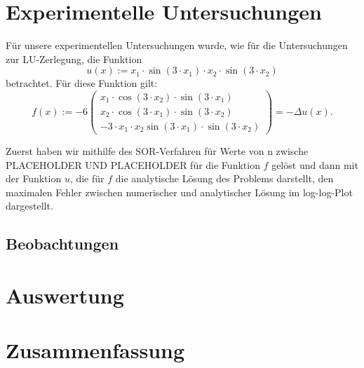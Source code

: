 \documentclass{scrartcl}
\theoremstyle{definition}
\begin{document}
\section{Experimentelle Untersuchungen}
Für unsere experimentellen Untersuchungen wurde, wie für die Untersuchungen zur LU-Zerlegung, die Funktion
\begin{equation}
u(x) := x_1 \cdot \sin(3 \cdot x_1) \cdot x_2 \cdot \sin(3 \cdot x_2)
\end{equation}
betrachtet. Für diese Funktion gilt:
\begin{equation*}
f(x) := -6 \begin{pmatrix}
x_1 \cdot \cos(3 \cdot x_2) \cdot \sin(3 \cdot x_1) \\ 
x_2 \cdot \cos(3 \cdot x_1) \cdot \sin(3 \cdot x_2) \\ 
-3 \cdot x_1 \cdot x_2 \sin(3 \cdot x_1) \cdot \sin(3 \cdot x_2)
\end{pmatrix}
= -\Delta u(x).
\end{equation*}

Zuerst haben wir mithilfe des SOR-Verfahren für Werte von n zwische PLACEHOLDER UND PLACEHOLDER für die Funktion \(f\) gelöst und dann mit der Funktion \(u\), die für \(f\) die analytische Lösung des Problems darstellt, den maximalen Fehler zwischen numerischer und analytischer Lösung im log-log-Plot dargestellt.










\subsection{Beobachtungen}



\section{Auswertung}



\section{Zusammenfassung}



\printbibliography%
\end{document}
